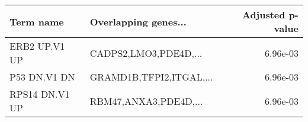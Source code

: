 \begin{tabular}{llr}
\toprule
     Term name &    Overlapping genes... &  Adjusted p-value \\
\midrule
 ERB2 UP.V1 UP &   CADPS2,LMO3,PDE4D,... &          6.96e-03 \\
  P53 DN.V1 DN & GRAMD1B,TFPI2,ITGAL,... &          6.96e-03 \\
RPS14 DN.V1 UP &   RBM47,ANXA3,PDE4D,... &          6.96e-03 \\
\bottomrule
\end{tabular}
